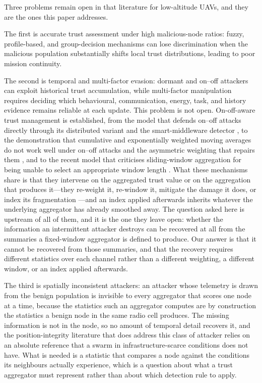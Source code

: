 \documentclass[notspecified,article,submit,moreauthors]{Definitions/mdpi}
\begin{document}
Three problems remain open in that literature for low-altitude UAVs, and they are the ones this paper addresses.

The first is accurate trust assessment under high malicious-node ratios: fuzzy, profile-based, and group-decision mechanisms can lose discrimination when the malicious population substantially shifts local trust distributions, leading to poor mission continuity.

The second is temporal and multi-factor evasion: dormant and on--off attackers can exploit historical trust accumulation, while multi-factor manipulation requires deciding which behavioural, communication, energy, task, and history evidence remains reliable at each update. This problem is not open. On-off-aware trust management is established, from the model that defends on--off attacks directly \cite{chae2014onoff} through its distributed variant \cite{mendoza2015onoff} and the smart-middleware detector \cite{caminha2018onoff}, to the demonstration that cumulative and exponentially weighted moving averages do not work well under on--off attacks and the asymmetric weighting that repairs them \cite{salimitari2020prospect}, and to the recent model that criticises sliding-window aggregation for being unable to select an appropriate window length \cite{ziauddin2026recfilter}. What these mechanisms share is that they intervene on the aggregated trust value or on the aggregation that produces it---they re-weight it, re-window it, mitigate the damage it does, or index its fragmentation \cite{kannan2023onoff}---and an index applied afterwards inherits whatever the underlying aggregator has already smoothed away. The question asked here is upstream of all of them, and it is the one they leave open: whether the information an intermittent attacker destroys can be recovered at all from the summaries a fixed-window aggregator is defined to produce. Our answer is that it cannot be recovered from those summaries, and that the recovery requires different statistics over each channel rather than a different weighting, a different window, or an index applied afterwards.

The third is spatially inconsistent attackers: an attacker whose telemetry is drawn from the benign population is invisible to every aggregator that scores one node at a time, because the statistics such an aggregator computes are by construction the statistics a benign node in the same radio cell produces. The missing information is not in the node, so no amount of temporal detail recovers it, and the position-integrity literature that does address this class of attacker relies on an absolute reference that a swarm in infrastructure-scarce conditions does not have. What is needed is a statistic that compares a node against the conditions its neighbours actually experience, which is a question about what a trust aggregator must represent rather than about which detection rule to apply.
\end{document}
